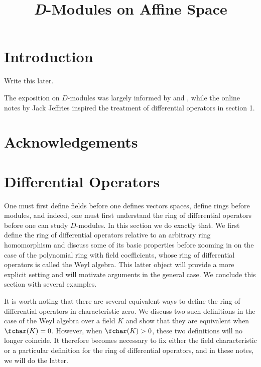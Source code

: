 
\usepackage{indentfirst}

\title{\textit{D}-Modules on Affine Space}
\date{}
\usepackage[showframe]{geometry}

\usepackage{titling}
\renewcommand\maketitlehooka{\null\mbox{}\vfill}
\renewcommand\maketitlehookd{\vfill\null}

\maketitle

\newpage

\tableofcontents
\newpage
\section*{Introduction}
Write this later.

The exposition on $D$-modules was largely informed by \cite{d-mod-primer} and \cite{d-mod_ps-rt}, while the online notes \cite{jeffries_d-mod} by Jack Jeffries inspired the treatment of differential operators in section 1. 

\section*{Acknowledgements}
\newpage
\section{Differential Operators}
One must first define fields before one defines vectors spaces, define rings before modules, and indeed, one must first understand the ring of differential operators before one can study $D$-modules. In this section we do exactly that. We first define the ring of differential operators relative to an arbitrary ring homomorphism and discuss some of its basic properties before zooming in on the case of the polynomial ring with field coefficients, whose ring of differential operators is called the Weyl algebra. This latter object will provide a more explicit setting and will motivate arguments in the general case. We conclude this section with several examples.

It is worth noting that there are several equivalent ways to define the ring of differential operators in characteristic zero. We discuss two such definitions in the case of the Weyl algebra over a field $K$ and show that they are equivalent when $\fchar(K) = 0$. However, when $\fchar(K) > 0$, these two definitions will no longer coincide. It therefore becomes necessary to fix either the field characteristic or a particular definition for the ring of differential operators, and in these notes, we will do the latter.


